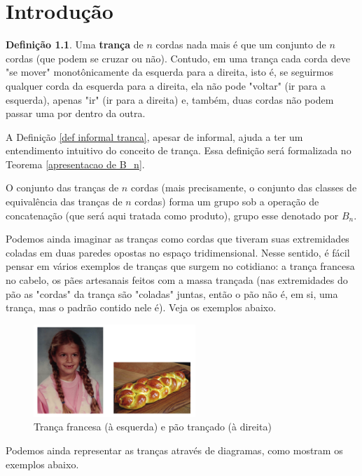 \documentclass[a4paper,portuguese,11pt,twoside, leqno]{book}
\theoremstyle{definition}
\newtheorem{deff}{Definição}[section]
\begin{document}
	\chapter{Introdução}
	\begin{deff}
		\label{def informal tranca}
		Uma \textbf{trança} de $n$ cordas nada mais é que um conjunto de $n$ cordas (que podem se cruzar ou não). Contudo, em uma trança cada corda deve "se mover" monotônicamente da esquerda para a direita, isto é, se seguirmos qualquer corda da esquerda para a direita, ela não pode "voltar" (ir para a esquerda), apenas "ir" (ir para a direita) e, também, duas cordas não podem passar uma por dentro da outra.
	\end{deff}
	
	\par\vspace{0.3cm} A Definição \eqref{def informal tranca}, apesar de informal, ajuda a ter um entendimento intuitivo do conceito de trança. Essa definição será formalizada no Teorema \eqref{apresentacao de B_n}.
	
	\par\vspace{0.3cm} O conjunto das tranças de $n$ cordas (mais precisamente, o conjunto das classes de equivalência das tranças de $n$ cordas) forma um grupo sob a operação de concatenação (que será aqui tratada como produto), grupo esse denotado por $B_n$. 
	\par\vspace{0.3cm} Podemos ainda imaginar as tranças como cordas que tiveram suas extremidades coladas em duas paredes opostas no espaço tridimensional. Nesse sentido, é fácil pensar em vários exemplos de tranças que surgem no cotidiano: a trança francesa no cabelo, os pães artesanais feitos com a massa trançada (nas extremidades do pão as "cordas" da trança são "coladas" juntas, então o pão não é, em si, uma trança, mas o padrão contido nele é). Veja os exemplos abaixo.
	
	\begin{figure}[H]
		\begin{center}
			\includegraphics[width=6.1cm]{Images/exemplos_trancas.png}
		\end{center}
		\caption{Trança francesa (à esquerda) e pão trançado (à direita)}\label{exemplos de trancas}
	\end{figure}
	\par\vspace{0.3cm} Podemos ainda representar as tranças através de diagramas, como mostram os exemplos abaixo.
	
\end{document}
